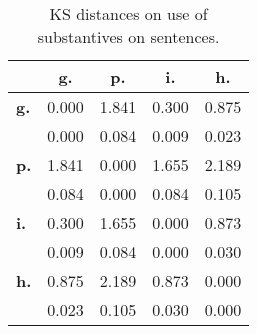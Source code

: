 \begin{table}[h!]
\begin{center}
\begin{tabular}{| l || c | c | c | c |}\hline
 & {\bf g.} & {\bf p.} & {\bf i.} & {\bf h.} \\\hline\hline
{\bf g.} & 0.000 & 1.841 & 0.300 & 0.875 \\
{\bf } & 0.000 & 0.084 & 0.009 & 0.023 \\\hline
{\bf p.} & 1.841 & 0.000 & 1.655 & 2.189 \\
{\bf } & 0.084 & 0.000 & 0.084 & 0.105 \\\hline
{\bf i.} & 0.300 & 1.655 & 0.000 & 0.873 \\
{\bf } & 0.009 & 0.084 & 0.000 & 0.030 \\\hline
{\bf h.} & 0.875 & 2.189 & 0.873 & 0.000 \\
{\bf } & 0.023 & 0.105 & 0.030 & 0.000 \\\hline
\end{tabular}
\caption{KS distances on use of substantives on sentences.}
\end{center}
\end{table}